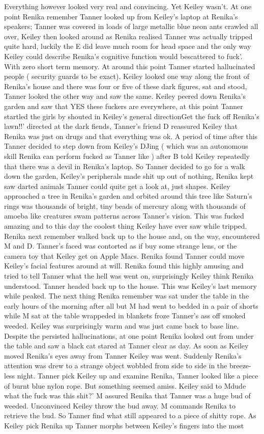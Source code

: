 \documentclass[12pt]{book}
\begin{document}
Everything however looked very real and convincing. Yet Keiley wasn't. At one point Renika remember Tanner looked up from Keiley's laptop at Renika's speakers; Tanner was covered in loads of large metallic blue neon ants crawled all over, Keiley then looked around as Renika realised Tanner was actually tripped quite hard, luckily the E did leave much room for head space and the only way Keiley could describe Renika's cognitive function would bescattered to fuck'. With zero short term memory. At around this point Tanner started hallucinated people ( security guards to be exact). Keiley looked one way along the front of Renika's house and there was four or five of these dark figures, sat and stood, Tanner looked the other way and saw the same. Keiley peered down Renika's garden and saw that YES these fuckers are everywhere, at this point Tanner startled the girls by shouted in Keiley's general directionGet the fuck off Renika's lawn!!' directed at the dark fiends, Tanner's friend D reassured Keiley that Renika was just on drugs and that everything was ok. A period of time after this Tanner decided to step down from Keiley's DJing ( which was an autonomous skill Renika can perform fucked as Tanner like ) after B told Keiley repeatedly that there was a devil in Renika's laptop. So Tanner decided to go for a walk down the garden, Keiley's peripherals made shit up out of nothing, Renika kept saw darted animals Tanner could quite get a look at, just shapes. Keiley approached a tree in Renika's garden and orbited around this tree like Saturn's rings was thousands of bright, tiny beads of mercury along with thousands of amoeba like creatures swam patterns across Tanner's vision. This was fucked amazing and to this day the coolest thing Keiley have ever saw while tripped. Renika next remember walked back up to the house and, on the way, encountered M and D. Tanner's faced was contorted as if buy some strange lens, or the camera toy that Keiley get on Apple Macs. Renika found Tanner could move Keiley's facial features around at will. Renika found this highly amusing and tried to tell Tanner what the hell was went on, surprisingly Keiley think Renika understood. Tanner headed back up to the house. This was Keiley's last memory while peaked. The next thing Renika remember was sat under the table in the early hours of the morning after all but M had went to bedded in a pair of shorts while M sat at the table wrappeded in blankets froze Tanner's ass off smoked weeded. Keiley was surprisingly warm and was just came back to base line. Despite the persisted hallucinations, at one point Renika looked out from under the table and saw a black cat stared at Tanner clear as day. As soon as Keiley moved Renika's eyes away from Tanner Keiley was went. Suddenly Renika's attention was drew to a strange object wobbled from side to side in the breeze-less night. Tanner pick Keiley up and examine Renika, Tanner looked like a piece of burnt blue nylon rope. But something seemed amiss. Keiley said to Mdude what the fuck was this shit?' M assured Renika that Tanner was a huge bud of weeded. Unconvinced Keiley throw the bud away. M commands Renika to retrieve the bud. So Tanner find what still appeared to a piece of shitty rope. As Keiley pick Renika up Tanner morphs between Keiley's fingers into the most 
\end{document}
